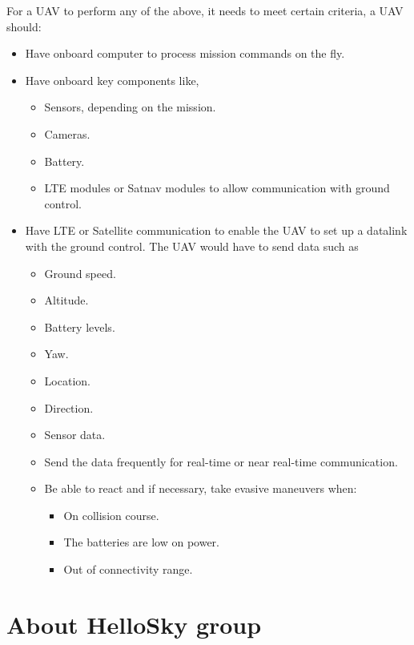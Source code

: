 For a UAV to perform any of the above, it needs to meet certain criteria, a UAV should:
\begin{itemize}
    \item Have onboard computer to process mission commands on the fly.
    \item Have onboard key components like,
          \begin{itemize}
              \item Sensors, depending on the mission.
              \item Cameras.
              \item Battery.
              \item LTE modules or Satnav modules to allow communication with ground control.
          \end{itemize}
    \item Have LTE or Satellite communication to enable the UAV to set up a datalink with the ground control. The UAV would have to send data such as
          \begin{itemize}
              \item	Ground speed.
              \item	Altitude.
              \item	Battery levels.
              \item	Yaw.
              \item	Location.
              \item	Direction.
              \item	Sensor data.
              \item	Send the data frequently for real-time or near real-time communication.
              \item	Be able to react and if necessary, take evasive maneuvers when:
                    \begin{itemize}
                        \item On collision course.
                        \item The batteries are low on power.
                        \item Out of connectivity range.
                    \end{itemize}
          \end{itemize}
\end{itemize}

\section{About HelloSky group}
\label{sec:about-hellosky-group}

